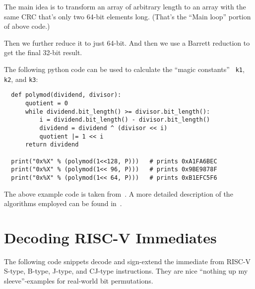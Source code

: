 The main idea is to transform an array of arbitrary length to an array with the
same CRC that's only two 64-bit elements long. (That's the ``Main loop''
portion of above code.)

Then we further reduce it to just 64-bit. And then we use a Barrett
reduction to get the final 32-bit result.

The following python code can be used to calculate the ``magic constants'' {\tt
k1}, {\tt k2}, and {\tt k3}:

\begin{minipage}{\linewidth}
\begin{verbatim}
  def polymod(dividend, divisor):
      quotient = 0
      while dividend.bit_length() >= divisor.bit_length():
          i = dividend.bit_length() - divisor.bit_length()
          dividend = dividend ^ (divisor << i)
          quotient |= 1 << i
      return dividend

  print("0x%X" % (polymod(1<<128, P)))   # prints 0xA1FA6BEC
  print("0x%X" % (polymod(1<< 96, P)))   # prints 0x9BE9878F
  print("0x%X" % (polymod(1<< 64, P)))   # prints 0xB1EFC5F6
\end{verbatim}
\end{minipage}

The above example code is taken from~\cite{Wolf18A}. A more detailed description of
the algorithms employed can be found in~\cite{FastCRC}.


\section{Decoding RISC-V Immediates}

The following code snippets decode and sign-extend the immediate from RISC-V
S-type, B-type, J-type, and CJ-type instructions. They are nice ``nothing up my
sleeve''-examples for real-world bit permutations.

